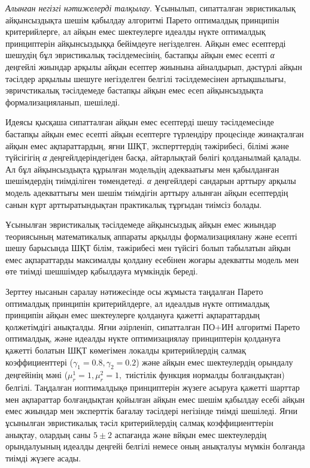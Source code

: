 \begin{multicols}{2}
\emph{Алынған негізгі нәтижелерді талқылау}. Ұсынылып, сипатталған
эвристикалық айқынсыздықта шешім қабылдау алгоритмі Парето оптималдық
принципін критерийлерге, ал айқын емес шектеулерге идеалды нүкте
оптималдық принциптерін айқынсыздыққа бейімдеуге негізделген. Айқын емес
есептерді шешудің бұл эвристикалық тәсілдемесінің, бастапқы айқын емес
есепті \emph{α} деңгейлі жиындар арқылы айқын есептер жиынына
айналдырып, дәстүрлі айқын тәсілдер арқылыы шешуге негізделген белгілі
тәсілдемесінен артықшылығы, эвричстикалық тәсілдемеде бастапқы айқын
емес есеп айқынсыздықта формализацияланып, шешіледі.

Идеясы қысқаша сипатталған айқын емес есептерді шешу тәсілдемесінде
бастапқы айқын емес есепті айқын есептерге түрлендіру процесінде
жинақталған айқын емес ақпараттардың, яғни ШҚТ, эксперттердің
тәжірибесі, білімі және түйсігігің \emph{α} деңгейлдеріндегіден басқа,
айтарлықтай бөлігі қолданылмай қалады. Ал бұл айқынсыздықта құрылған
модельдің адекваатығы мен қабылданған шешімдердің тиімділіген
төмендетеді. \emph{α} деңгейлдері сандарын арттыру арқылы модель
адекваттығы мен шешім тиімдігін арттыру алынған айқын есептердің санын
күрт арттыратындықтан практикалық тұрғыдан тиімсіз болады.

Ұсынылған эвристикалық тәсілдемеде айқынсыздық айқын емес жиындар
теориясының математикалық аппараты арқылды формализациялану және есепті
шешу барысында ШҚТ білім, тәжірибесі мен түйсігі болып табылатын айқын
емес ақпараттарды максималды қолдану есебінен жоғары адекватты модель
мен өте тиімді шешшімдер қабылдауға мүмкіндік береді.

Зерттеу нысанын саралау нәтижесінде осы жұмыста таңдалған Парето
оптималдық принципін критерийлдерге, ал идеалдыв нүкте оптималдық
принципін айқын емес шектеулерге қолдануға қажетті ақпараттардың
қолжетімдігі анықталды. Яғни әзірленіп, сипатталған ПО+ИН алгоритмі
Парето оптималдық, және идеалды нүкте оптимизациялау принциптерін
қолдануға қажетті болатын ШҚТ көмегімен локалды критерийлердің салмақ
коэффициенттері ($\gamma_1=0.8,\gamma_2=0.2$) және айқын емес
шектеулердің орындалу деңгейінің мәні
($\mu_r^1=1,\mu_r^2=1,$ тиістілік функция нормалды
болғандықтан) белгілі. Таңдалған иоптималдықө принциптерін жүзеге
асыруға қажетті шарттар мен ақпараттар болғандықтан қойылған айқын емес
шешім қабылдау есебі айқын емес жиындар мен эксперттік бағалау тәсілдері
негізінде тиімді шешіледі. Яғни ұсынылған эвристикалық тәсіл
критерийлердің салмақ коэффициенттерін анықтау, олардың саны
$5\pm2$ аспағанда және вйқын емес
шектеулердің орындалуының идеалды деңгейі белгілі немесе оның анықталуы
мүмкін болғанда тиімді жүзеге асады.


\end{multicols}
